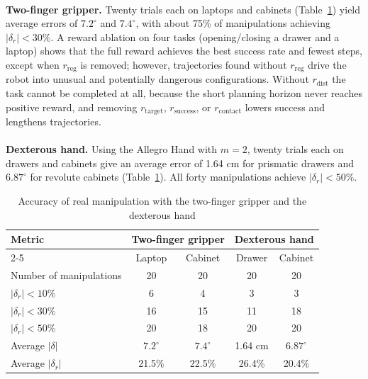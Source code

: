 \documentclass[12pt,a4paper,final]{extreport}
\begin{document}
\paragraph{} \textbf{Two-finger gripper.} Twenty trials each on laptops and cabinets (Table~\ref{tab:dex_2f}) yield average errors of $7.2^{\circ}$ and $7.4^{\circ}$, with about 75\% of manipulations achieving $|\delta_r|<30\%$. A reward ablation on four tasks (opening/closing a drawer and a laptop) shows that the full reward achieves the best success rate and fewest steps, except when $r_{\mathrm{reg}}$ is removed; however, trajectories found without $r_{\mathrm{reg}}$ drive the robot into unusual and potentially dangerous configurations. Without $r_{\mathrm{dist}}$ the task cannot be completed at all, because the short planning horizon never reaches positive reward, and removing $r_{\mathrm{target}}$, $r_{\mathrm{success}}$, or $r_{\mathrm{contact}}$ lowers success and lengthens trajectories.

\paragraph{} \textbf{Dexterous hand.} Using the Allegro Hand with $m=2$, twenty trials each on drawers and cabinets give an average error of 1.64 cm for prismatic drawers and $6.87^{\circ}$ for revolute cabinets (Table~\ref{tab:dex_2f}). All forty manipulations achieve $|\delta_r|<50\%$.

{\renewcommand{\arraystretch}{1.2}
\begin{table}[htbp]
\centering
\caption{Accuracy of real manipulation with the two-finger gripper and the dexterous hand \cite{p1}}\label{tab:dex_2f}
\small
\begin{tabular}{|l|c|c|c|c|}
\hline
\multirow{2}{*}{\textbf{Metric}} & \multicolumn{2}{c|}{\textbf{Two-finger gripper}} & \multicolumn{2}{c|}{\textbf{Dexterous hand}} \\ \cline{2-5}
 & Laptop & Cabinet & Drawer & Cabinet \\ \hline
Number of manipulations & 20 & 20 & 20 & 20 \\ \hline
$|\delta_r|<10\%$ & 6 & 4 & 3 & 3 \\ \hline
$|\delta_r|<30\%$ & 16 & 15 & 11 & 18 \\ \hline
$|\delta_r|<50\%$ & 20 & 18 & 20 & 20 \\ \hline
Average $|\delta|$ & $7.2^{\circ}$ & $7.4^{\circ}$ & 1.64 cm & $6.87^{\circ}$ \\ \hline
Average $|\delta_r|$ & 21.5\% & 22.5\% & 26.4\% & 20.4\% \\ \hline
\end{tabular}
\end{table}}
\end{document}
